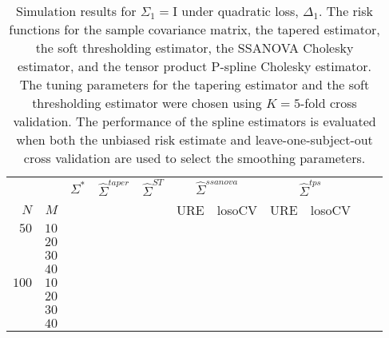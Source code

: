 \documentclass[12pt]{article}
\newcommand{\ra}[1]{\renewcommand{\arraystretch}{#1}}
\theoremstyle{definition}
\begin{document}
\begin{table}\centering
\ra{1.3}
\caption{Simulation results for $\Sigma_1 = \mathrm{I}$ under quadratic loss, $\Delta_1$. The risk functions for the sample covariance matrix, the tapered estimator, the soft thresholding estimator, the SSANOVA Cholesky estimator, and the tensor product P-spline Cholesky estimator. The tuning parameters for the tapering estimator and the soft thresholding estimator were chosen using $K = 5$-fold cross validation. The performance of the spline estimators is evaluated when both the unbiased risk estimate and leave-one-subject-out cross validation are used to select the smoothing parameters.}
\begin{tabular}{@{}rrrcrcrrcrr@{}}\toprule
   &            & \multicolumn{1}{c}{$\Sigma^*$}  & \multicolumn{1}{c}{$\hat{\Sigma}^{taper}$} &\multicolumn{1}{c}{$\hat{\Sigma}^{ST}$} &\multicolumn{2}{c}{ $\hat{\Sigma}^{ssanova}$} &  \multicolumn{2}{c}{ $\hat{\Sigma}^{tps}$}\\
$N$ & $M$ 	&	  &	& & \multicolumn{1}{c}{\mbox{URE}} & \multicolumn{1}{c}{\mbox{losoCV}} &\multicolumn{1}{c}{\mbox{URE}} & \multicolumn{1}{c}{\mbox{losoCV}}\\ \midrule
$50$ & $10$\\
  & $20$  &&&&&&&\\
  & $30$   &&&&&&&\\
& $40$   &&&&&&&\\ 
$100$ & $10$ &&&&&&&\\
& $20$  &&&&&&& \\
& $30$  &&&&&&& \\
& $40$  &&&&&&& \\ 
\bottomrule
\end{tabular}
\end{table}
\end{document}

